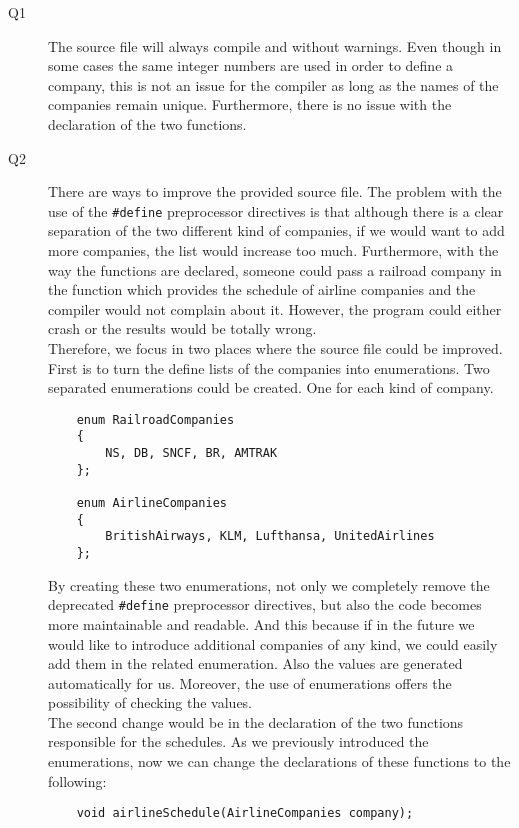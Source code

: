 \documentclass[a4paper]{article}
\begin{document}
\begin{description}
	\item[Q1]\-
	The source file will always compile and without warnings. Even though in some cases the same integer numbers are used in order to define a company, this is not an issue for the compiler as long as the names of the companies remain unique. Furthermore, there is no issue with the declaration of the two functions.
	\item[Q2]\-
	There are ways to improve the provided source file. The problem with the use of the \verb|#define| preprocessor directives is that although there is a clear separation of the two different kind of companies, if we would want to add more companies, the list would increase too much. Furthermore, with the way the functions are declared, someone could pass a railroad company in the function which provides the schedule of airline companies and the compiler would not complain about it. However, the program could either crash or the results would be totally wrong.\\
	
	Therefore, we focus in two places where the source file could be improved. First is to turn the define lists of the companies into enumerations. Two separated enumerations could be created. One for each kind of company.
	
	\begin{verbatim}
	enum RailroadCompanies
	{
	    NS, DB, SNCF, BR, AMTRAK
	};
	
	enum AirlineCompanies
	{
	    BritishAirways, KLM, Lufthansa, UnitedAirlines
	};
	\end{verbatim}
	
	By creating these two enumerations, not only we completely remove the deprecated \verb|#define| preprocessor directives, but also the code becomes more maintainable and readable. And this because if in the future we would like to introduce additional companies of any kind, we could easily add them in the related enumeration. Also the values are generated automatically for us. Moreover, the use of enumerations offers the possibility of checking the values.\\
	
	The second change would be in the declaration of the two functions responsible for the schedules. As we previously introduced the enumerations, now we can change the declarations of these functions to the following:
	
	\begin{verbatim}
	void airlineSchedule(AirlineCompanies company);
	

\end{verbatim}
\end{description}
\end{document}
